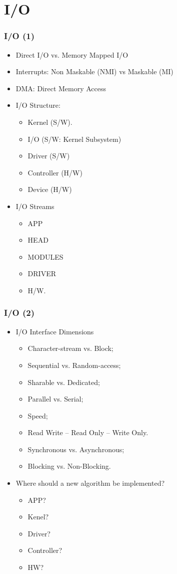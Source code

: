 \documentclass[xcolor=table, notheorems, hyperref={pdfpagelabels=false}]{beamer}
\begin{document}
\section{I/O}
\begin{frame}
\frametitle{I/O (1)}
\begin{itemize}
\item Direct I/O vs. Memory Mapped I/O
\item Interrupts: Non Maskable (NMI) vs Maskable (MI)
\item DMA: Direct Memory Access
\item I/O Structure:
\begin{itemize}
\item Kernel (S/W).
\item I/O (S/W: Kernel Subsystem)
\item Driver (S/W)
\item Controller (H/W)
\item Device (H/W)
\end{itemize}
\item I/O Streams
\begin{itemize}
\item APP
\item HEAD
\item MODULES
\item DRIVER
\item H/W.
\end{itemize}
\end{itemize}
\end{frame}

\begin{frame}
\frametitle{I/O (2)}
\begin{itemize}
\item I/O Interface Dimensions
\begin{itemize}
\item Character-stream vs. Block;
\item Sequential vs. Random-access;
\item Sharable vs. Dedicated;
\item Parallel vs. Serial;
\item Speed;
\item Read Write -- Read Only -- Write Only.
\item Synchronous vs. Asynchronous;
\item Blocking vs. Non-Blocking.
\end{itemize}
\item Where should a new algorithm be implemented?
\begin{itemize}
\item APP?
\item Kenel?
\item Driver?
\item Controller?
\item HW?
\end{itemize}
\end{itemize}
\end{frame}
\end{document}
